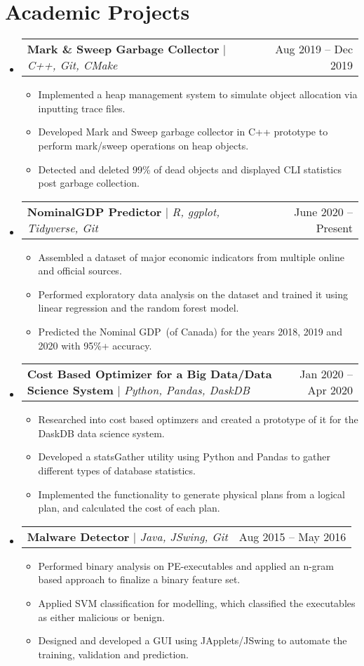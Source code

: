 \documentclass[letterpaper,10pt]{article}
\makeatletter
\newcommand{\resumeItem}[1]{
  \item\small{
    {#1 \vspace{-2pt}}
  }
}
\newcommand{\resumeProjectHeading}[2]{
    \item
    \begin{tabular*}{0.97\textwidth}{l@{\extracolsep{\fill}}r}
      \small#1 & #2 \\
    \end{tabular*}\vspace{-7pt}
}
\newcommand{\resumeSubHeadingListStart}{\begin{itemize}[leftmargin=0.15in, label={}]}
\newcommand{\resumeSubHeadingListEnd}{\end{itemize}}
\newcommand{\resumeItemListStart}{\begin{itemize}}
\newcommand{\resumeItemListEnd}{\end{itemize}\vspace{-5pt}}
\makeatother
\begin{document}
\section{Academic Projects}
    \resumeSubHeadingListStart
    \resumeProjectHeading
          {\textbf{Mark \& Sweep Garbage Collector} $|$ \emph{C++, Git, CMake}}{Aug 2019 -- Dec 2019}
          \resumeItemListStart
            \resumeItem{Implemented a heap management system to simulate object allocation via inputting trace files.}
            \resumeItem{Developed Mark and Sweep garbage collector in C++ prototype to perform mark/sweep operations on heap objects.}
            \resumeItem{Detected and deleted 99\% of dead objects and displayed CLI statistics post garbage collection.}
          \resumeItemListEnd  
      \resumeProjectHeading
          {\textbf{NominalGDP Predictor} $|$ \emph{R, ggplot, Tidyverse, Git}}{June 2020 -- Present}
          \resumeItemListStart
            \resumeItem{Assembled a dataset of major economic indicators from multiple online and official sources.}
            \resumeItem{Performed exploratory data analysis on the dataset and trained it using linear regression and the random forest model.}
            \resumeItem{Predicted the Nominal GDP~(of Canada) for the years 2018, 2019 and 2020 with 95\%+ accuracy.}
          \resumeItemListEnd
         \resumeProjectHeading
          {\textbf{Cost Based Optimizer for a Big Data/Data Science System} $|$ \emph{Python, Pandas, DaskDB}}{Jan 2020 -- Apr 2020}
          \resumeItemListStart
            \resumeItem{Researched into cost based optimzers and created a prototype of it for the DaskDB data science system.}
            \resumeItem{Developed a statsGather utility using Python and Pandas to gather different types of database statistics.}
            \resumeItem{Implemented the functionality to generate physical plans from a logical plan, and calculated the cost of each plan.}
          \resumeItemListEnd
      \resumeProjectHeading
          {\textbf{Malware Detector} $|$ \emph{Java, JSwing, Git}}{Aug 2015 -- May 2016}
          \resumeItemListStart
            \resumeItem{Performed binary analysis on PE-executables and applied an n-gram based approach to finalize a binary feature set.}
            \resumeItem{Applied SVM classification for modelling, which classified the executables as either malicious or benign.}
            \resumeItem{Designed and developed a GUI using JApplets/JSwing to automate the training, validation and prediction.}
          \resumeItemListEnd
    \resumeSubHeadingListEnd
\end{document}
